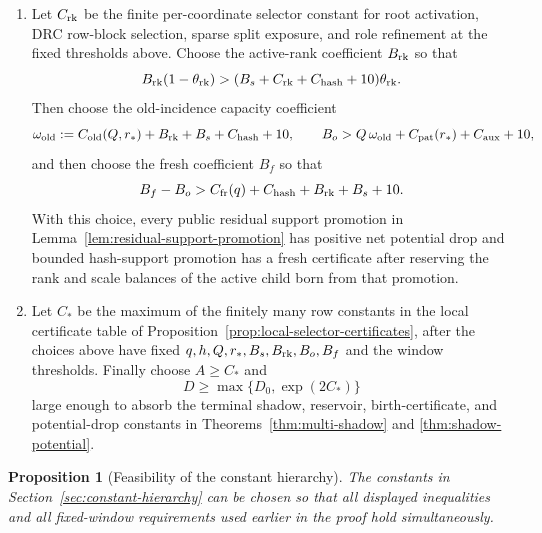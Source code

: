 \documentclass[11pt]{article}
\newtheorem{proposition}[theorem]{Proposition}
\begin{document}
\begin{enumerate}[label=\textup{(\arabic*)}]
finite auxiliary transcript constant $C_{\rm aux}$ in
Lemma~\ref{lem:fresh-reset-pruning}.
\item Let $C_{\rm rk}$ be the finite per-coordinate selector constant for
root activation, DRC row-block selection, sparse split exposure, and role
refinement at the fixed thresholds above.  Choose the active-rank coefficient
$B_{\rm rk}$ so that
\[
  B_{\rm rk}(1-\theta_{\rm rk})
  >(B_s+C_{\rm rk}+C_{\rm hash}+10)\theta_{\rm rk}.
\]
Then choose the old-incidence capacity coefficient
  \[
    \omega_{\rm old}:=C_{\rm old}(Q,r_*)+B_{\rm rk}+B_s+C_{\rm hash}+10,
    \qquad
    B_o>Q\,\omega_{\rm old}+C_{\rm pat}(r_*)+C_{\rm aux}+10,
  \]
  and then choose the fresh
coefficient $B_f$ so that
\[
  B_f-B_o > C_{\rm fr}(q)+C_{\rm hash}+B_{\rm rk}+B_s+10 .
\]
With this choice, every public residual support promotion in
Lemma~\ref{lem:residual-support-promotion} has positive net potential drop and
bounded hash-support promotion has a fresh certificate after reserving the
rank and scale balances of the active child born from that promotion.
\item Let $C_*$ be the maximum of the finitely many row constants in the local
certificate table of Proposition~\ref{prop:local-selector-certificates}, after the choices above have
fixed $q,h,Q,r_*,B_s,B_{\rm rk},B_o,B_f$ and the window thresholds.  Finally choose
$A\ge C_*$ and
\[
  D\ge \max\{D_0,\exp(2C_*)\}
\]
large enough to absorb the terminal shadow, reservoir, birth-certificate, and
potential-drop constants in Theorems~\ref{thm:multi-shadow} and
\ref{thm:shadow-potential}.
\end{enumerate}

\begin{proposition}[Feasibility of the constant hierarchy]
\label{prop:constant-feasibility}
The constants in Section~\ref{sec:constant-hierarchy} can be chosen so that
all displayed inequalities and all fixed-window requirements used earlier in
the proof hold simultaneously.
\end{proposition}
\end{document}
